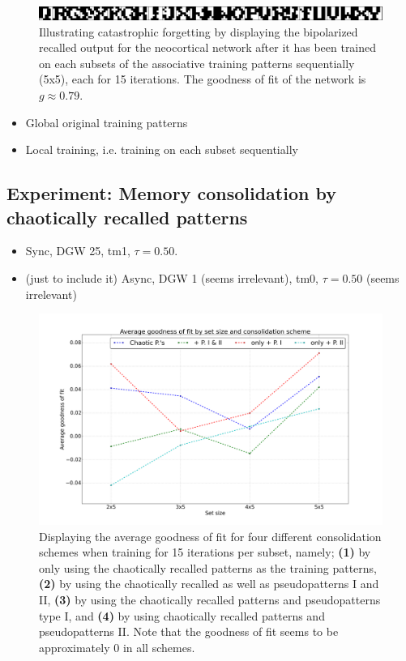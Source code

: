\begin{figure}
    \centering
    \includegraphics[width=12cm]{fig/neo-intro-demo/local_aggregate_im}
    \caption{Illustrating catastrophic forgetting by displaying the bipolarized recalled output for the neocortical network after it has been trained on each subsets of the associative training patterns sequentially (5x5), each for 15 iterations. The goodness of fit of the network is $g\approx0.79$.}
    \label{fig:local_aggregate_im}
\end{figure}

\begin{itemize}
    \item Global original training patterns
    \item Local training, i.e. training on each subset sequentially
\end{itemize}

\subsection{Experiment: Memory consolidation by chaotically recalled patterns}

\begin{itemize}
    \item Sync, DGW 25, tm1, $\tau=0.50$.
    \item (just to include it) Async, DGW 1 (seems irrelevant), tm0, $\tau=0.50$ (seems irrelevant)
\end{itemize}

\begin{figure}
    \centering
    \includegraphics[width=14cm]{fig/neo-consolidation/consolidation-schemes-sync-tm1-tr30_15_iters}
    \caption{Displaying the average goodness of fit for four different consolidation schemes when training for 15 iterations per subset, namely; \textbf{(1)} by only using the chaotically recalled patterns as the training patterns, \textbf{(2)} by using the chaotically recalled as well as pseudopatterns I and II, \textbf{(3)} by using the chaotically recalled patterns and pseudopatterns type I, and \textbf{(4)} by using chaotically recalled patterns and pseudopatterns II. Note that the goodness of fit seems to be approximately 0 in all schemes.}
    \label{fig:consolidation-schemes-sync}
\end{figure}

